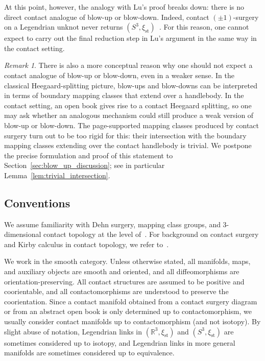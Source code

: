 \documentclass{amsart}
\numberwithin{equation}{section}
\numberwithin{figure}{section}
\theoremstyle{definition}
\theoremstyle{remark}
\newtheorem{remark}[theorem]{Remark}
\newcommand{\R}{\mathbb{R}}
\let\olddxi\xi %
\renewcommand{\xi}{\olddxi}
\newcommand{\xist}{\olddxi_{\mathrm{st}}}
\begin{document}
At this point, however, the analogy with Lu's proof breaks down: there is no direct contact analogue of blow-up or blow-down. Indeed, contact $(\pm1)$-surgery on a Legendrian unknot never returns $(S^3,\xist)$~\cite{Kegel_Legendrian_complement}. For this reason, one cannot expect to carry out the final reduction step in Lu's argument in the same way in the contact setting.

\begin{remark}\label{rmk_weak_blowup}
There is also a more conceptual reason why one should not expect a contact analogue of blow-up or blow-down, even in a weaker sense. In the classical Heegaard-splitting picture, blow-ups and blow-downs can be interpreted in terms of boundary mapping classes that extend over a handlebody. In the contact setting, an open book gives rise to a contact Heegaard splitting, so one may ask whether an analogous mechanism could still produce a weak version of blow-up or blow-down. The page-supported mapping classes produced by contact surgery turn out to be too rigid for this: their intersection with the boundary mapping classes extending over the contact handlebody is trivial. We postpone the precise formulation and proof of this statement to Section~\ref{sec:blow_up_discussion}; see in particular Lemma~\ref{lem:trivial_intersection}.
\end{remark}

\subsection*{Conventions}

We assume familiarity with Dehn surgery, mapping class groups, and \(3\)-dimensional contact topology at the level of~\cite{Gompf_Stipsicz,FM12,Geiges_book}. For background on contact surgery and Kirby calculus in contact topology, we refer to~\cite{Gompf,Ozbagci_Stipsicz,Ding_Geiges_fillable,Ding_Geiges_Stipsicz,Ding_Geiges,Ding_Geiges_slides,Kegel_thesis,Kegel_Legendrian_complement,Kegel_Onaran,Etnyre_Kegel_Onaran,Casals_Etnyre_Kegel}.

We work in the smooth category. Unless otherwise stated, all manifolds, maps, and auxiliary objects are smooth and oriented, and all diffeomorphisms are orientation-preserving. All contact structures are assumed to be positive and coorientable, and all contactomorphisms are understood to preserve the coorientation. Since a contact manifold obtained from a contact surgery diagram or from an abstract open book is only determined up to contactomorphism, we usually consider contact manifolds up to contactomorphism (and not isotopy). By slight abuse of notation, Legendrian links in $(\R^3,\xist)$ and $(S^3,\xist)$ are sometimes considered up to isotopy, and Legendrian links in more general manifolds are sometimes considered up to equivalence.
\end{document}
